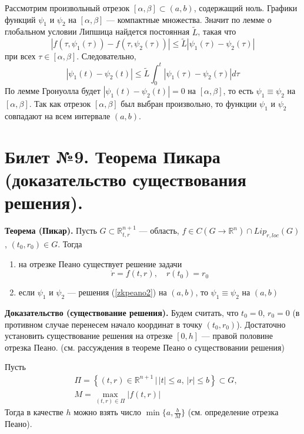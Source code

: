 \documentclass{article}
\begin{document}
Рассмотрим произвольный отрезок $[\alpha, \beta] \subset (a,b)$, содержащий ноль. Графики функций $\psi_1$ и $\psi_2$ на $[\alpha, \beta]$ --- компактные множества. Значит по лемме о глобальном условии Липшица найдется постоянная $\widetilde{L}$, такая что
\begin{equation*}
    |f(\tau, \psi_1(\tau)) - f(\tau, \psi_2(\tau))| \le \widetilde{L}|\psi_1(\tau) - \psi_2(\tau)|
\end{equation*}
при всех $\tau \in [\alpha,\beta]$. Следовательно,
\begin{equation*}
    |\psi_1(t) - \psi_2(t)| \le \widetilde{L} \int_0^t |\psi_1(\tau) - \psi_2(\tau)|d\tau
\end{equation*}
По лемме Гронуолла будет $|\psi_1(t) - \psi_2(t)| = 0$ на $[\alpha, \beta]$, то есть $\psi_1 \equiv \psi_2$ на $[\alpha,\beta]$. Так как отрезок $[\alpha, \beta]$ был выбран произвольно, то функции $\psi_1$ и $\psi_2$ совпадают на всем интервале $(a,b)$.

\section{Билет №9. Теорема Пикара (доказательство существования решения).}
\textbf{Теорема (Пикар).} Пусть $G \subset \mathbb{R}_{t,r}^{n+1}$ --- область, $f \in C(G \to \mathbb{R}^n) \cap Lip_{r,loc}(G)$, $(t_0, r_0) \in G$. Тогда
\begin{enumerate}
    \item на отрезке Пеано существует решение задачи
    \begin{equation}
        \dot{r} = f(t,r), \quad r(t_0) = r_0 \label{zkpeano2}
    \end{equation}
    \item если $\psi_1$ и $\psi_2$ --- решения (\ref{zkpeano2}) на $(a,b)$, то $\psi_1 \equiv \psi_2$ на $(a,b)$
\end{enumerate}
\textbf{Доказательство (существование решения).} Будем считать, что $t_0 = 0$, $r_0 = 0$ (в противном случае перенесем начало координат в точку $(t_0, r_0)$). Достаточно установить существование решения на отрезке $[0, h]$ --- правой половине отрезка Пеано. (см. рассуждения в теореме Пеано о существовании решения)

Пусть
\begin{equation*}
    \begin{aligned}
        &\Pi = \left\{(t,r) \in \mathbb{R}^{n + 1}\,|\, |t| \le a,\, |r| \le b\right\} \subset G,\\
        &M = \max_{(t,r) \in \Pi} |f(t,r)|
    \end{aligned}
\end{equation*}
Тогда в качестве $h$ можно взять число $\min \{a, \frac{b}{M}\}$ (см. определение отрезка Пеано).
\end{document}
